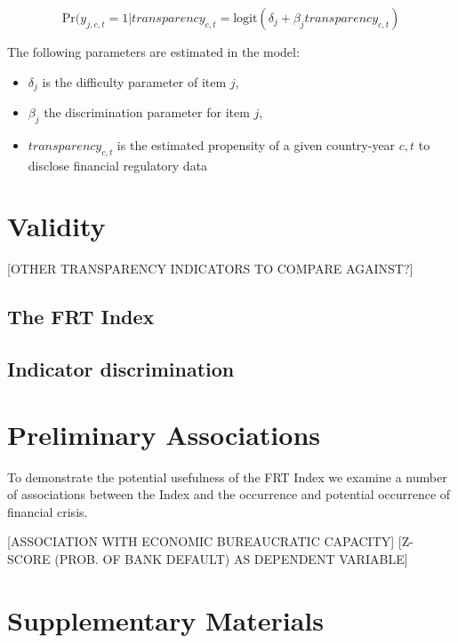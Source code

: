 \documentclass[a4paper]{article}
\begin{document}
\[
    \mathrm{Pr}(y_{j,c,t} = 1|transparency_{c,t} = \mathrm{logit}(\delta_{j} + \beta_{j}transparency_{c,t})
\]

The following parameters are estimated in the model:

\begin{itemize}
    \item $\delta_{j}$ is the difficulty parameter of item $j$,
    \item $\beta_{j}$ the discrimination parameter for item $j$,
    \item $transparency_{c,t}$ is the estimated propensity of a given country-year $c,t$ to disclose financial regulatory data
\end{itemize}


\section{Validity}

[OTHER TRANSPARENCY INDICATORS TO COMPARE AGAINST?]

\subsection{The FRT Index}

\subsection{Indicator discrimination}

\section{Preliminary Associations}

To demonstrate the potential usefulness of the FRT Index we examine a number of associations between the Index and the occurrence and potential occurrence of financial crisis.

[ASSOCIATION WITH ECONOMIC BUREAUCRATIC CAPACITY]
[Z-SCORE (PROB. OF BANK DEFAULT) AS DEPENDENT VARIABLE]




\section*{Supplementary Materials}
\end{document}
